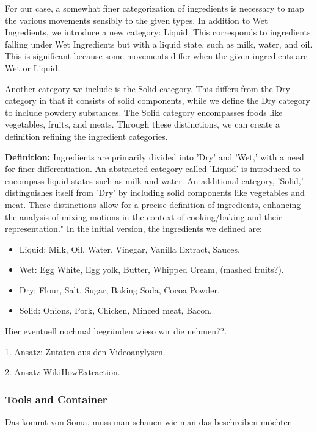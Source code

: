 For our case, a somewhat finer categorization of ingredients is necessary to map the various movements sensibly to the given types. In addition to Wet Ingredients, we introduce a new category: Liquid. This corresponds to ingredients falling under Wet Ingredients but with a liquid state, such as milk, water, and oil. This is significant because some movements differ when the given ingredients are Wet or Liquid.

Another category we include is the Solid category. This differs from the Dry category in that it consists of solid components, while we define the Dry category to include powdery substances. The Solid category encompasses foods like vegetables, fruits, and meats. Through these distinctions, we can create a definition refining the ingredient categories.

\textbf{Definition:}
Ingredients are primarily divided into 'Dry' and 'Wet,' with a need for finer differentiation. An abstracted category called 'Liquid' is introduced to encompass liquid states such as milk and water. An additional category, 'Solid,' distinguishes itself from 'Dry' by including solid components like vegetables and meat. These distinctions allow for a precise definition of ingredients, enhancing the analysis of mixing motions in the context of cooking/baking and their representation."
In the initial version, the ingredients we defined are:
\begin{itemize}
  \item Liquid: Milk, Oil, Water, Vinegar, Vanilla Extract, Sauces.
  \item Wet: Egg White, Egg yolk, Butter, Whipped Cream, (mashed fruits?).
  \item Dry: Flour, Salt, Sugar, Baking Soda, Cocoa Powder.
  \item Solid: Onions, Pork, Chicken, Minced meat, Bacon.
\end{itemize}

Hier eventuell nochmal begründen wieso wir die nehmen??.

1. Ansatz: Zutaten aus den Videoanylysen.

2. Ansatz WikiHowExtraction.

\subsubsection*{Tools and Container}
Das kommt von Soma, muss man schauen wie man das beschreiben möchten

